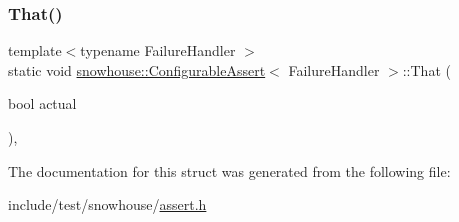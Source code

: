 \mbox{\label{structsnowhouse_1_1ConfigurableAssert_a92fb92e2cbdc18889915c6effa87b89f}} 
\subsubsection{\texorpdfstring{That()}{That()}\hspace{0.1cm}{\footnotesize\ttfamily [5/5]}}
{\footnotesize\ttfamily template$<$typename Failure\+Handler $>$ \\
static void \mbox{\hyperlink{structsnowhouse_1_1ConfigurableAssert}{snowhouse\+::\+Configurable\+Assert}}$<$ Failure\+Handler $>$\+::That (\begin{DoxyParamCaption}\item[{bool}]{actual }\end{DoxyParamCaption})\hspace{0.3cm}{\ttfamily [inline]}, {\ttfamily [static]}}



The documentation for this struct was generated from the following file\+:\begin{DoxyCompactItemize}
\item 
include/test/snowhouse/\mbox{\hyperlink{assert_8h}{assert.\+h}}\end{DoxyCompactItemize}

